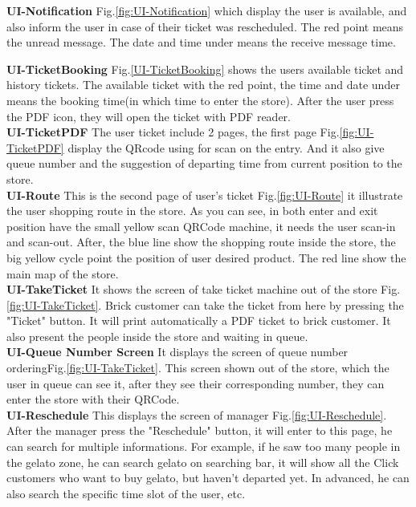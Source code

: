 \documentclass[a4paper,12pt]{report}
\begin{document}
\textbf{UI-Notification}  Fig.\ref{fig:UI-Notification} which display the user is available, and also inform the user in case of their ticket was rescheduled. The red point means the unread message. The date and time under means the receive message time.

\textbf{UI-TicketBooking}  Fig.\ref{UI-TicketBooking} shows the users available ticket and history tickets. The available ticket with the red point, the time and date under means the booking time(in which time to enter the store). After the user press the PDF icon, they will open the ticket with PDF reader.~\\

\textbf{UI-TicketPDF} The user ticket include 2 pages, the first page Fig.\ref{fig:UI-TicketPDF} display the QRcode using for scan on the entry. And it also give queue number and the suggestion of departing time from current position to the store.~\\

\textbf{UI-Route} This is the second page of user's ticket Fig.\ref{fig:UI-Route} it illustrate the user shopping route in the store. As you can see, in both enter and exit position have the small yellow scan QRCode machine, it needs the user scan-in and scan-out. After, the blue line show the shopping route inside the store, the big yellow cycle point the position of user desired product. The red line show the main map of the store.~\\
 
\textbf{UI-TakeTicket} It shows the screen of take ticket machine out of the store Fig.\ref{fig:UI-TakeTicket}. Brick customer can take the ticket from here by pressing the "Ticket" button. It will print automatically a PDF ticket to brick customer. It also present the people inside the store and waiting in queue.~\\

\textbf{UI-Queue Number Screen} It displays the screen of queue number orderingFig.\ref{fig:UI-TakeTicket}. This screen shown out of the store, which the user in queue can see it, after they see their corresponding number, they can enter the store with their QRCode.~\\

\textbf{UI-Reschedule} This displays the screen of manager Fig.\ref{fig:UI-Reschedule}. After the manager press the "Reschedule" button, it will enter to this page, he can search for multiple informations. For example, if he saw too many people in the gelato zone, he can search gelato on searching bar, it will show all the Click customers who want to buy gelato, but haven't departed yet. In advanced, he can also search the specific time slot of the user, etc. ~\\  
\end{document}
